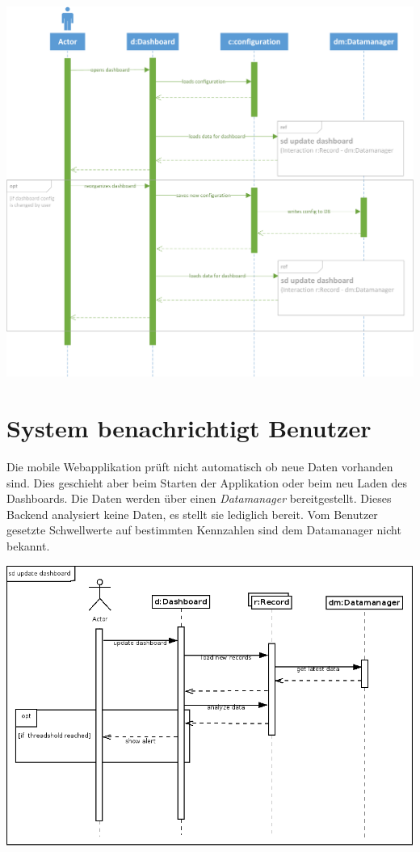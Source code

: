 \documentclass[a4paper]{scrreprt}
\begin{document}
\bigskip

\includegraphics[width=1\textwidth]{./sequence_update.png}

\section{System benachrichtigt Benutzer}
Die mobile Webapplikation prüft nicht automatisch ob neue Daten vorhanden sind. Dies geschieht aber beim Starten der Applikation oder beim neu Laden des Dashboards.
Die Daten werden über einen \textit{Datamanager} bereitgestellt. Dieses Backend analysiert keine Daten, es stellt sie lediglich bereit. Vom Benutzer gesetzte Schwellwerte auf bestimmten Kennzahlen sind dem Datamanager nicht bekannt.

\bigskip

\includegraphics[width=1\textwidth]{./sequence_alert.png}
\end{document}

